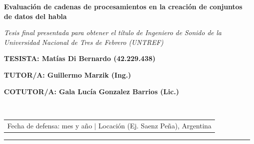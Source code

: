 \documentclass[12pt]{article}
\begin{document}
\begin{titlepage}
\centering


\vspace{0.1cm}

\hspace*{-1.31cm}%
\begin{minipage}[t]{16cm}
\centering
{}
\vspace{0.5cm} %

\end{minipage}


\vspace{36pt}

{\bfseries\fontsize{22pt}{24pt} \selectfont Evaluación de cadenas de procesamientos en la creación de conjuntos de datos del habla \par}

\vspace{22pt}


\vspace{44pt}

{\itshape\fontsize{14pt}{24pt}\selectfont Tesis final presentada para obtener el título de Ingeniero de Sonido de la Universidad Nacional de Tres de Febrero (UNTREF)}

\vspace{70pt}

{\bfseries\fontsize{14pt}{0pt}\selectfont TESISTA: Matías Di Bernardo (42.229.438) \par}
{\bfseries\fontsize{14pt}{0pt}\selectfont TUTOR/A: Guillermo Marzik (Ing.) \par}
{\bfseries\fontsize{14pt}{0pt}\selectfont COTUTOR/A: Gala Lucía Gonzalez Barrios (Lic.) \par}

\vfill

\begin{table}[h]
\hrulefill \\ 
\begin{tabular}{c}
Fecha de defensa: mes y año $\lvert$ Locación (Ej. Saenz Peña), Argentina \\
\end{tabular}
\end{table}
\hrule
\end{titlepage}
\end{document}
